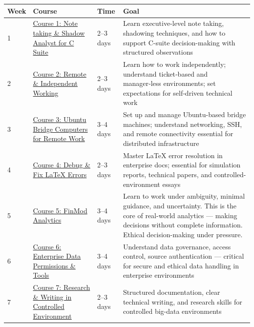 \documentclass[12pt]{article}
\begin{document}
	\begin{tabularx}{\textwidth}{|X|p{3cm}|p{3cm}|X|}
		\hline
		\textbf{Week} & \textbf{Course} & \textbf{Time} & \textbf{Goal} \\
		\hline
		1 & \href{https://www.udemy.com/course/note-taking-course-and-shadow-analyst-for-c-suite-analyst/}{Course 1: Note taking \& Shadow Analyst for C Suite} & 2–3 days & Learn executive-level note taking, shadowing techniques, and how to support C-suite decision-making with structured observations \\
		\hline
		2 & \href{https://www.udemy.com/course/remote-independent-working-in-a-managerless-environment-101/}{Course 2: Remote \& Independent Working} & 2–3 days & Learn how to work independently; understand ticket‑based and manager‑less environments; set expectations for self‑driven technical work \\
		\hline
		3 & \href{https://www.udemy.com/course/connecting-managing-ubuntu-bridge-computers-for-remote-work/}{Course 3: Ubuntu Bridge Computers for Remote Work} & 3–4 days & Set up and manage Ubuntu-based bridge machines; understand networking, SSH, and remote connectivity essential for distributed infrastructure \\
		\hline
		4 & \href{https://www.udemy.com/course/debug-and-fix-latex-errors-in-enterprise-environments/}{Course 4: Debug \& Fix LaTeX Errors} & 2–3 days & Master LaTeX error resolution in enterprise docs; essential for simulation reports, technical papers, and controlled-environment essays \\
		\hline
		5 & \href{https://www.udemy.com/course/finmod-analytics-with-min-guidance-no-info-uncertain-env/}{Course 5: FinMod Analytics} & 3–4 days & Learn to work under ambiguity, minimal guidance, and uncertainty. This is the core of real-world analytics — making decisions without complete information. Ethical decision-making under pressure. \\
		\hline
		6 & \href{https://www.udemy.com/course/enterprise-data-permissions-sources-tools-connections/}{Course 6: Enterprise Data Permissions \& Tools} & 3–4 days & Understand data governance, access control, source authentication — critical for secure and ethical data handling in enterprise environments \\
		\hline
		7 & \href{https://www.udemy.com/course/research-writing-skills-for-essays-in-controlled-environment}{Course 7: Research \& Writing in Controlled Environment} & 2–3 days & Structured documentation, clear technical writing, and research skills for controlled big-data environments \\
		\hline
	\end{tabularx}
	
\end{document}
